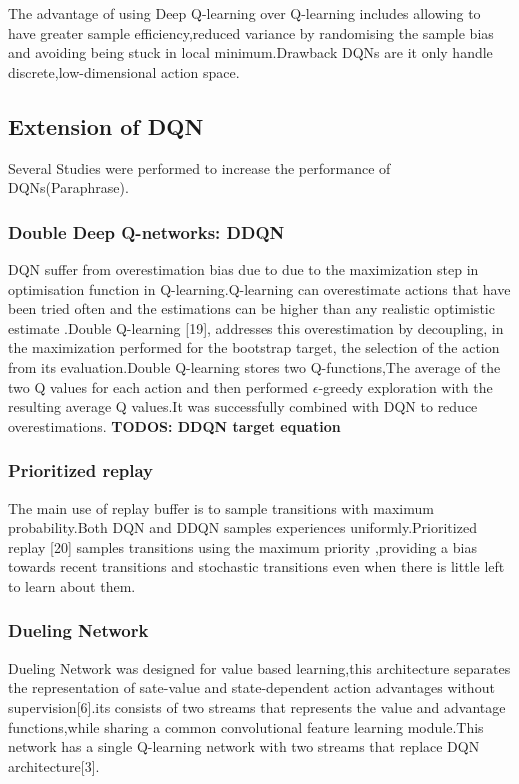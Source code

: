 The advantage of using Deep Q-learning over Q-learning  includes allowing  to have greater sample efficiency,reduced variance by randomising the sample bias and avoiding being stuck in local minimum.Drawback  DQNs are it only handle discrete,low-dimensional action space.\\


\subsection{Extension of DQN }

Several Studies were performed to increase the performance of DQNs(Paraphrase).

\subsubsection{Double Deep Q-networks: DDQN}

DQN suffer from overestimation bias due to due to the maximization step in optimisation function in Q-learning.Q-learning can overestimate actions that have been tried often and the estimations can be higher than any realistic optimistic estimate .Double Q-learning [19], addresses this overestimation by decoupling, in the maximization performed for the bootstrap target, the selection of the action from its evaluation.Double Q-learning stores two Q-functions,The average of the two Q values for each action and then performed $\mathcal{\epsilon}$-greedy exploration with the resulting average Q values.It was successfully combined with DQN to reduce  overestimations.\textbf{ TODOS: DDQN  target equation}

\subsubsection{Prioritized replay}

The main use of replay buffer is to sample transitions with maximum probability.Both DQN and DDQN samples experiences uniformly.Prioritized replay [20] samples transitions using the maximum priority ,providing a bias towards recent transitions and stochastic transitions  even when there is little left to learn about them.

\subsubsection{Dueling Network}

Dueling Network was designed for  value based learning,this architecture separates the representation of sate-value and state-dependent action advantages without supervision[6].its consists of two streams that represents the value and advantage functions,while sharing a common convolutional feature learning module.This network has a single Q-learning network with two streams that replace DQN architecture[3]. 

